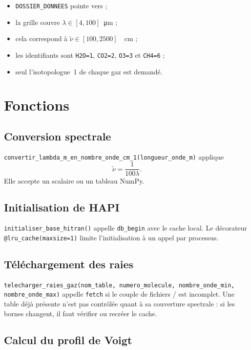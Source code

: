 \documentclass[11pt,a4paper]{article}
\begin{document}
\begin{itemize}
  \item \texttt{DOSSIER\_DONNEES} pointe vers  ;
  \item la grille couvre $\lambda\in[4,100]$~\si{\micro\metre} ;
  \item cela correspond à
        $\widetilde\nu\in[100,2500]$~\si{\per\centi\metre} ;
  \item les identifiants sont \texttt{H2O=1}, \texttt{CO2=2},
        \texttt{O3=3} et \texttt{CH4=6} ;
  \item seul l'isotopologue~1 de chaque gaz est demandé.
\end{itemize}

\section{Fonctions}

\subsection{Conversion spectrale}

\texttt{convertir\_lambda\_m\_en\_nombre\_onde\_cm\_1(longueur\_onde\_m)}
applique
\begin{equation}
  \widetilde\nu=\frac{1}{100\lambda}.
\end{equation}
Elle accepte un scalaire ou un tableau NumPy.

\subsection{Initialisation de HAPI}

\texttt{initialiser\_base\_hitran()} appelle \texttt{db\_begin} avec le cache
local. Le décorateur \texttt{@lru\_cache(maxsize=1)} limite l'initialisation à
un appel par processus.

\subsection{Téléchargement des raies}

\texttt{telecharger\_raies\_gaz(nom\_table, numero\_molecule,
nombre\_onde\_min, nombre\_onde\_max)} appelle \texttt{fetch} si le couple de
fichiers / est incomplet. Une table déjà présente
n'est pas contrôlée quant à sa couverture spectrale : si les bornes changent,
il faut vérifier ou recréer le cache.

\subsection{Calcul du profil de Voigt}
\end{document}
